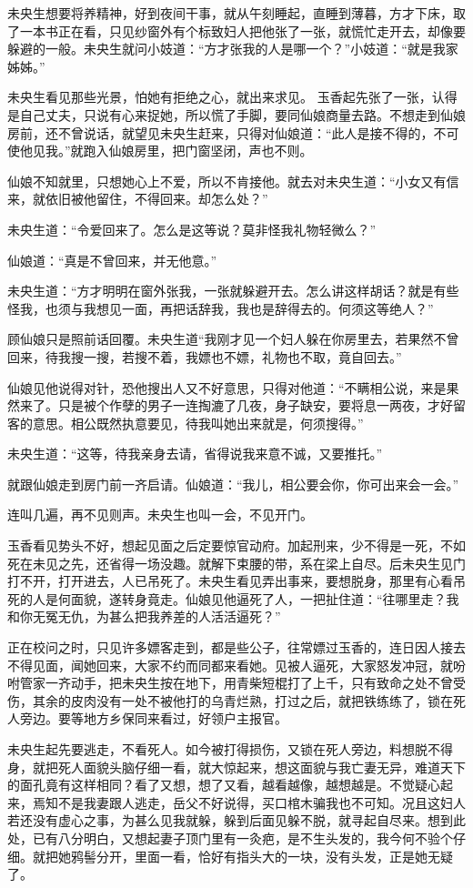 \documentclass[a4paper,12pt,UTF8,twoside]{ctexbook}
\begin{document}
未央生想要将养精神，好到夜间干事，就从午刻睡起，直睡到薄暮，方才下床，取了一本书正在看，只见纱窗外有个标致妇人把他张了一张，就慌忙走开去，却像要躲避的一般。未央生就问小妓道：“方才张我的人是哪一个？”小妓道：“就是我家姊姊。”

未央生看见那些光景，怕她有拒绝之心，就出来求见。 玉香起先张了一张，认得是自己丈夫，只说有心来捉她，所以慌了手脚，要同仙娘商量去路。不想走到仙娘房前，还不曾说话，就望见未央生赶来，只得对仙娘道：“此人是接不得的，不可使他见我。”就跑入仙娘房里，把门窗坚闭，声也不则。

仙娘不知就里，只想她心上不爱，所以不肯接他。就去对未央生道：“小女又有信来，就依旧被他留住，不得回来。却怎么处？”

未央生道：“令爱回来了。怎么是这等说？莫非怪我礼物轻微么？”

仙娘道：“真是不曾回来，并无他意。”

未央生道：“方才明明在窗外张我，一张就躲避开去。怎么讲这样胡话？就是有些怪我，也须与我想见一面，再把话辞我，我也是辞得去的。何须这等绝人？”

顾仙娘只是照前话回覆。未央生道“我刚才见一个妇人躲在你房里去，若果然不曾回来，待我搜一搜，若搜不着，我嫖也不嫖，礼物也不取，竟自回去。”

仙娘见他说得对针，恐他搜出人又不好意思，只得对他道：“不瞒相公说，来是果然来了。只是被个作孽的男子一连掏漉了几夜，身子缺安，要将息一两夜，才好留客的意思。相公既然执意要见，待我叫她出来就是，何须搜得。”

未央生道：“这等，待我亲身去请，省得说我来意不诚，又要推托。”

就跟仙娘走到房门前一齐启请。仙娘道：“我儿，相公要会你，你可出来会一会。”

连叫几遍，再不见则声。未央生也叫一会，不见开门。

玉香看见势头不好，想起见面之后定要惊官动府。加起刑来，少不得是一死，不如死在未见之先，还省得一场没趣。就解下束腰的带，系在梁上自尽。后未央生见门打不开，打开进去，人已吊死了。未央生看见弄出事来，要想脱身，那里有心看吊死的人是何面貌，遂转身竟走。仙娘见他逼死了人，一把扯住道：“往哪里走？我和你无冤无仇，为甚么把我养差的人活活逼死？”

正在校问之时，只见许多嫖客走到，都是些公子，往常嫖过玉香的，连日因人接去不得见面，闻她回来，大家不约而同都来看她。见被人逼死，大家怒发冲冠，就吩咐管家一齐动手，把未央生按在地下，用青柴短棍打了上千，只有致命之处不曾受伤，其余的皮肉没有一处不被他打的乌青烂熟，打过之后，就把铁练练了，锁在死人旁边。要等地方乡保同来看过，好领户主报官。

未央生起先要逃走，不看死人。如今被打得损伤，又锁在死人旁边，料想脱不得身，就把死人面貌头脑仔细一看，就大惊起来，想这面貌与我亡妻无异，难道天下的面孔竟有这样相同？看了又想，想了又看，越看越像，越想越是。不觉疑心起来，焉知不是我妻跟人逃走，岳父不好说得，买口棺木骗我也不可知。况且这妇人若还没有虚心之事，为甚么见我就躲，躲到后面见躲不脱，就寻起自尽来。想到此处，已有八分明白，又想起妻子顶门里有一灸疤，是不生头发的，我今何不验个仔细。就把她鸦髻分开，里面一看，恰好有指头大的一块，没有头发，正是她无疑了。
\end{document}
